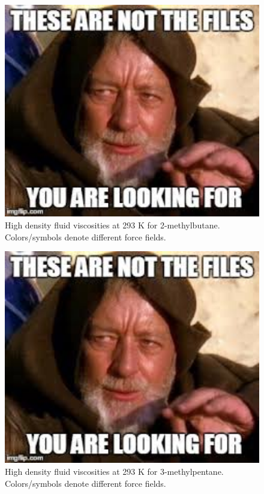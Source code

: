 \documentclass[preprint,review,12pt]{elsarticle}
\begin{document}
\begin{figure}[p!]
	\centering
	\includegraphics[width=6.4in]{empty_figure.jpg}
	\caption{High density fluid viscosities at 293 K for 2-methylbutane. Colors/symbols denote different force fields.}
	\label{fig:T293highP_IC5}
\end{figure} 

\begin{figure}[p!]
	\centering
	\includegraphics[width=6.4in]{empty_figure.jpg}
	\caption{High density fluid viscosities at 293 K for 3-methylpentane. Colors/symbols denote different force fields.}
	\label{fig:T293highP_3MP}
\end{figure} 
\end{document}
